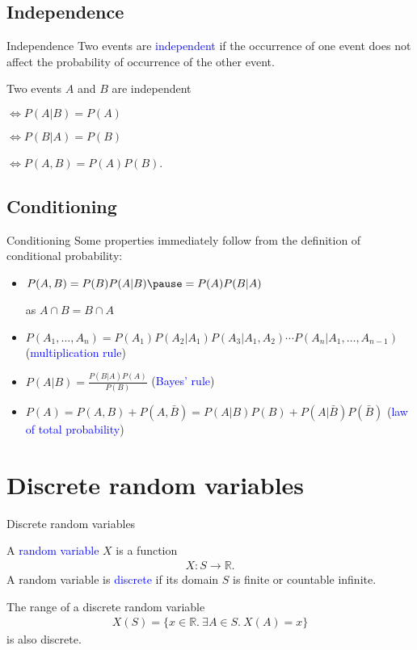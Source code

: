 \documentclass{beamer}
\def\padding{\vspace{0.5cm}}
\def\b{\textcolor{blue}}
\begin{document}
\subsection{Independence}
\begin{frame}{Independence}
    Two events are \b{independent} if the occurrence of one event does not affect the probability of occurrence of the other event.\pause\par\padding
    Two events $A$ and $B$ are independent\par
    $\iff P(A|B) = P(A)$\pause\par
    $\iff P(B|A) = P(B)$\pause\par
    $\iff P(A,B) = P(A) P(B)$.
\end{frame}

\subsection{Conditioning}
\begin{frame}{Conditioning}
    Some properties immediately follow from the definition of conditional probability:\pause
    \begin{itemize}
        \item $P(A,B) = P(B) P(A|B)\pause = P(A) P(B|A)$\par as $A \cap B = B \cap A$\pause
        \item $P(A_1, \dots, A_n) = P(A_1) P(A_2|A_1) P(A_3|A_1, A_2) \cdots P(A_n|A_1, \dots, A_{n-1})$ (\b{multiplication rule})\pause
        \item $P(A|B) = \frac{P(B|A) P(A)}{P(B)}$ (\b{Bayes' rule})\pause
        \item $P(A) = P(A,B) + P(A,\bar{B}) = P(A|B) P(B) + P(A|\bar{B}) P(\bar{B})$ (\b{law of total probability})
    \end{itemize}
\end{frame}

\section{Discrete random variables}
\begin{frame}{Discrete random variables}
    \begin{definition}
        A \b{random variable} $X$ is a function
        \begin{align*}
            X: S \to \mathbb{R}.
        \end{align*}\pause
        A random variable is \b{discrete} if its domain $S$ is finite or countable infinite.
    \end{definition}\pause\padding
    The range of a discrete random variable
    \begin{align*}
        X(S) = \{x \in \mathbb{R}.\ \exists A \in S.\ X(A) = x\}
    \end{align*}
    is also discrete.
\end{frame}
\end{document}
